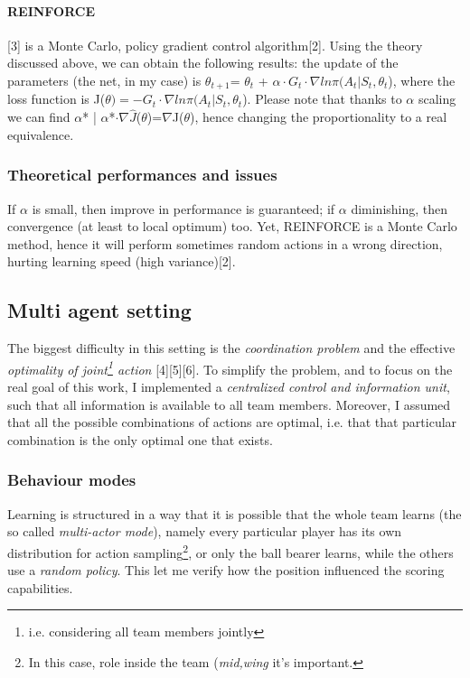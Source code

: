 \documentclass{article}
\begin{document}
\paragraph{REINFORCE}[3] is a Monte Carlo, policy gradient control algorithm[2]. Using the theory discussed above, we can obtain the following results: the update of the parameters (the net, in my case) is $\theta_{t+1}$= $\theta_t$ + $\alpha\cdot G_t\cdot\nabla ln\pi(A_t | S_t,\theta_t$), where the loss function is J($\theta) = - G_t\cdot\nabla ln\pi(A_t | S_t,\theta_t$).\newline
Please note that thanks to $\alpha$ scaling we can find $\alpha$* | $\alpha$*$\cdot\nabla\hat{J}$($\theta$)=$\nabla$J($\theta$), hence changing the proportionality to a real equivalence.
\subsubsection{Theoretical performances and issues}
If $\alpha$ is small, then improve in performance is guaranteed; if $\alpha$ diminishing, then convergence (at least to local optimum) too. Yet, REINFORCE is a Monte Carlo method, hence it will perform sometimes random actions in a wrong direction, hurting learning speed (high variance)[2].

\subsection{Multi agent setting}
The biggest difficulty in this setting is the \emph{coordination problem} and the effective \emph{optimality of joint\footnote{i.e. considering all team members jointly} action} [4][5][6].
To simplify the problem, and to focus on the real goal of this work, I implemented a \emph{centralized control and information unit}, such that all information is available to all team members. Moreover, I assumed that all the possible combinations of actions are optimal, i.e. that that particular combination is the only optimal one that exists.

\subsubsection{Behaviour modes}
\label{single_multi_mode}
Learning is structured in a way that it is possible that the whole team learns (the so called \emph{multi-actor mode}), namely every particular player has its own distribution for action sampling\footnote{In this case, role inside the team (\emph{mid,wing} it's important.}, or only the ball bearer learns, while the others use a \emph{random policy}. This let me verify how the position influenced the scoring capabilities.
\end{document}
